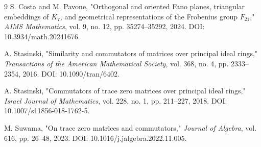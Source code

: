 \documentclass[11pt]{article}
\theoremstyle{definition}
\begin{document}
\begin{thebibliography}{9}
S. Costa and M. Pavone,
"Orthogonal and oriented Fano planes, triangular embeddings of $K_7$, and geometrical representations of the Frobenius group $F_{21}$,"
\emph{AIMS Mathematics}, vol. 9, no. 12, pp. 35274--35292, 2024.
DOI: 10.3934/math.20241676.

A. Stasinski,
"Similarity and commutators of matrices over principal ideal rings,"
\emph{Transactions of the American Mathematical Society}, vol. 368, no. 4, pp. 2333--2354, 2016. DOI: 10.1090/tran/6402.

A. Stasinski,
"Commutators of trace zero matrices over principal ideal rings,"
\emph{Israel Journal of Mathematics}, vol. 228, no. 1, pp. 211--227, 2018. DOI: 10.1007/s11856-018-1762-5.

M. Suwama,
"On trace zero matrices and commutators,"
\emph{Journal of Algebra}, vol. 616, pp. 26--48, 2023.
DOI: 10.1016/j.jalgebra.2022.11.005.
\end{thebibliography}
\end{document}
